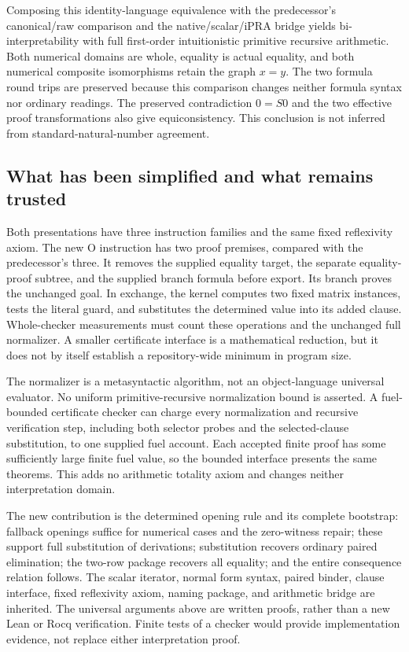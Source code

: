 Composing this identity-language equivalence with the predecessor's
canonical/raw comparison and the native/scalar/iPRA bridge yields
bi-interpretability with full first-order intuitionistic primitive recursive
arithmetic.  Both numerical domains are whole, equality is actual equality,
and both numerical composite isomorphisms retain the graph $x=y$.
The two formula round trips are preserved because this comparison changes
neither formula syntax nor ordinary readings.  The preserved contradiction
$0=S0$ and the two effective proof transformations also give equiconsistency.
This conclusion is not inferred from standard-natural-number agreement.

\subsection{What has been simplified and what remains trusted}

Both presentations have three instruction families and the same fixed
reflexivity axiom.  The new O instruction has two proof premises, compared
with the predecessor's three.  It removes the supplied equality target,
the separate equality-proof subtree, and the supplied branch formula
before export.  Its branch proves the unchanged goal.  In exchange, the
kernel computes two fixed matrix instances, tests the literal guard, and
substitutes the determined value into its added clause.  Whole-checker
measurements must count these operations and the unchanged full normalizer.
A smaller certificate interface is a mathematical reduction, but it does
not by itself establish a repository-wide minimum in program size.

The normalizer is a metasyntactic algorithm, not an object-language
universal evaluator.  No uniform primitive-recursive normalization bound
is asserted.  A fuel-bounded certificate checker can charge every
normalization and recursive verification step, including both selector
probes and the selected-clause substitution, to one supplied fuel account.
Each accepted finite proof has some sufficiently large finite fuel value,
so the bounded interface presents the same theorems.  This adds no
arithmetic totality axiom and changes neither interpretation domain.

The new contribution is the determined opening rule and its complete
bootstrap: fallback openings suffice for numerical cases and the
zero-witness repair; these support full substitution of derivations;
substitution recovers ordinary paired elimination; the two-row package
recovers all equality; and the entire consequence relation follows.
The scalar iterator, normal form syntax, paired binder, clause interface,
fixed reflexivity axiom, naming package, and arithmetic bridge are inherited.
The universal arguments above are written proofs, rather than a new
Lean or Rocq verification.  Finite tests of a checker would provide
implementation evidence, not replace either interpretation proof.
